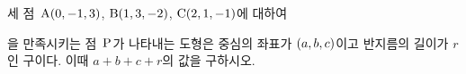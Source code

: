 세 점~$\mathrm{A}(0{,}\mkern3mu\mathopen{}-1{,}\mkern3mu\mathopen{}3)$, $\mathrm{B}(1{,}\mkern3mu\mathopen{}3{,}\mkern3mu\mathopen{}-2)$, $\mathrm{C}(2{,}\mkern3mu\mathopen{}1{,}\mkern3mu\mathopen{}-1)$에 대하여 \par\smallskip{}\par\smallskip\noindent 을 만족시키는 점~$\mathrm{P}$가 나타내는 도형은 중심의 좌표가 $(a{,}\mkern3mu\mathopen{}b{,}\mkern3mu\mathopen{}c)$이고 반지름의 길이가 $r$인 구이다. 이때 $a+b+c+r$의 값을 구하시오.
